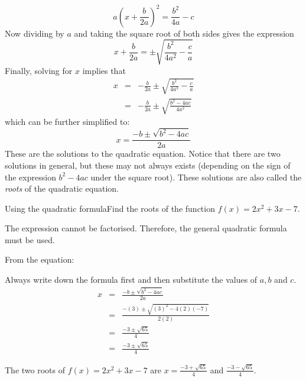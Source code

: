 \begin{equation}
a(x + \frac{b}{2a})^{2} = \frac{b^{2}}{4a} - c
\end{equation}
Now dividing by $a$ and taking the square root of both sides gives the
expression
\begin{equation}
x + \frac{b}{2a} = \pm\sqrt{\frac{b^{2}}{4a^{2}} - \frac{c}{a}}
\end{equation}
Finally, solving for $x$ implies that
\begin{eqnarray*}
x& =& -\frac{b}{2a} \pm\sqrt{\frac{b^{2}}{4a^{2}} - \frac{c}{a}}\\
&=& -\frac{b}{2a} \pm \sqrt{\frac{b^{2} - 4ac}{4a^{2}}}
\end{eqnarray*}
which can be further simplified to:
\begin{equation}
x = \frac{-b \pm \sqrt{b^{2} - 4ac}}{2a}
\label{eq:qform}
\end{equation}
These are the solutions to the quadratic equation. Notice that there are two
solutions in general, but these may not always exists (depending on the sign of
the expression $b^{2} - 4ac$ under the square root). These solutions are also
called the \textit{roots} of the quadratic equation.

\begin{wex}{Using the quadratic formula}{Find the roots of the function $f(x) = 2x^{2} + 3x - 7$.}{
The expression cannot be factorised. Therefore, the general quadratic formula must be used.

From the equation:

Always write down the formula first and then substitute the values of $a, b$ and $c$.
\begin{eqnarray}
x & =& \frac{-b \pm \sqrt{b^{2} - 4ac}}{2a} \\
& =& \frac{-(3) \pm \sqrt{(3)^{2} -4(2)(-7)}}{2(2)} \\
& =& \frac{-3 \pm \sqrt{65}}{4} \\
& =& \frac{-3 \pm \sqrt{65}}{4}
\end{eqnarray}

The two roots of $f(x) = 2x^{2} + 3x - 7$ are $x = \frac{-3 + \sqrt{65}}{4}$ and $\frac{-3 - \sqrt{65}}{4}$.}
\end{wex}

